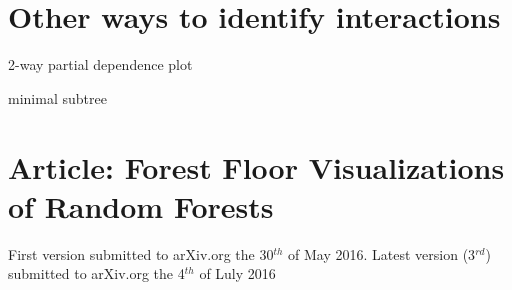 \section{Other ways to identify interactions}

2-way partial dependence plot

minimal subtree \cite{ishwaran2010high}



\section{Article: Forest Floor Visualizations of Random Forests}

First version submitted to arXiv.org the 30$^{th}$ of May 2016.
Latest version (3$^{rd}$) submitted to arXiv.org the 4$^{th}$ of Luly 2016

\newpage

